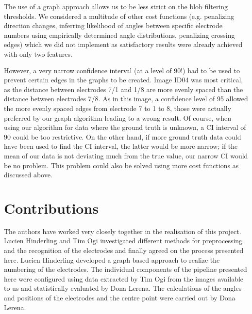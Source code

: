 \documentclass[a4paper, 10pt, twocolumn]{article}
\begin{document}
The use of a graph approach allows us to be less strict on the blob filtering thresholds. We considered a multitude of other cost functions (e.g. penalizing direction changes, inferring likelihood of angles between specific electrode numbers using empirically determined angle distributions, penalizing crossing edges) which we did not implement as satisfactory results were already achieved with only two features.

However, a very narrow confidence interval (at a level of 90!) had to be used to prevent certain edges in the graphs to be created. Image ID04 was most critical, as the distance between electrodes 7/1 and 1/8 are more evenly spaced than the distance between electrodes 7/8. As in this image, a confidence level of 95 allowed the more evenly spaced edges from electrode 7 to 1 to 8, those were actually preferred by our graph algorithm leading to a wrong result. 
Of course, when using our algorithm for data where the ground truth is unknown, a CI interval of 90 could be too restrictive. On the other hand, if more ground truth data could have been used to find the CI interval, the latter would be more narrow; if the mean of our data is not deviating much from the true value, our narrow CI would be no problem. 
This problem could also be solved using more cost functions as discussed above. 




\section{Contributions}
The authors have worked very closely together in the realisation of this project. Lucien Hinderling and Tim Ogi investigated different methods for preprocessing and the recognition of the electrodes and finally agreed on the process presented here. Lucien Hinderling developed a graph based approach to realize the numbering of the electrodes. The individual components of the pipeline presented here were configured using data extracted by Tim Ogi from the images available to us and statistically evaluated by Dona Lerena. The calculations of the angles and positions of the electrodes and the centre point were carried out by Dona Lerena.




\end{document}
